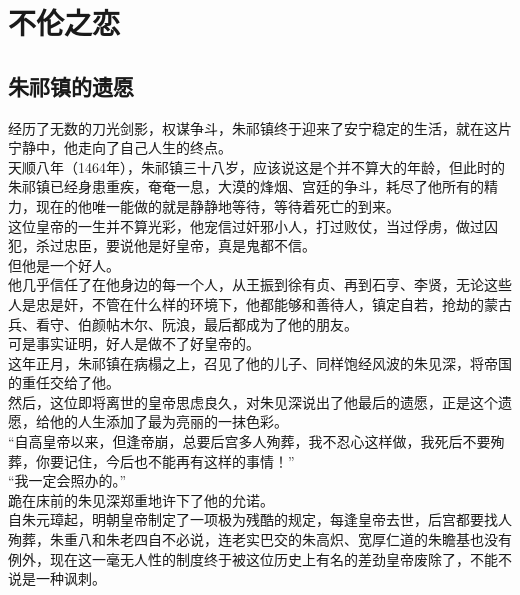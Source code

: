\section{不伦之恋}
\ifnum{}
	\begin{multicols}{\theparacolNo}
\fi
\subsection{朱祁镇的遗愿}
经历了无数的刀光剑影，权谋争斗，朱祁镇终于迎来了安宁稳定的生活，就在这片宁静中，他走向了自己人生的终点。\\

天顺八年（1464年），朱祁镇三十八岁，应该说这是个并不算大的年龄，但此时的朱祁镇已经身患重疾，奄奄一息，大漠的烽烟、宫廷的争斗，耗尽了他所有的精力，现在的他唯一能做的就是静静地等待，等待着死亡的到来。\\

这位皇帝的一生并不算光彩，他宠信过奸邪小人，打过败仗，当过俘虏，做过囚犯，杀过忠臣，要说他是好皇帝，真是鬼都不信。\\

但他是一个好人。\\

他几乎信任了在他身边的每一个人，从王振到徐有贞、再到石亨、李贤，无论这些人是忠是奸，不管在什么样的环境下，他都能够和善待人，镇定自若，抢劫的蒙古兵、看守、伯颜帖木尔、阮浪，最后都成为了他的朋友。\\

可是事实证明，好人是做不了好皇帝的。\\

这年正月，朱祁镇在病榻之上，召见了他的儿子、同样饱经风波的朱见深，将帝国的重任交给了他。\\

然后，这位即将离世的皇帝思虑良久，对朱见深说出了他最后的遗愿，正是这个遗愿，给他的人生添加了最为亮丽的一抹色彩。\\

“自高皇帝以来，但逢帝崩，总要后宫多人殉葬，我不忍心这样做，我死后不要殉葬，你要记住，今后也不能再有这样的事情！”\\

“我一定会照办的。”\\

跪在床前的朱见深郑重地许下了他的允诺。\\

自朱元璋起，明朝皇帝制定了一项极为残酷的规定，每逢皇帝去世，后宫都要找人殉葬，朱重八和朱老四自不必说，连老实巴交的朱高炽、宽厚仁道的朱瞻基也没有例外，现在这一毫无人性的制度终于被这位历史上有名的差劲皇帝废除了，不能不说是一种讽刺。\\


\end{multicols}
